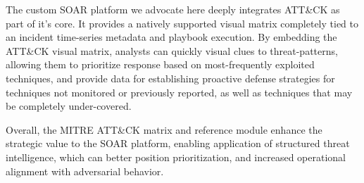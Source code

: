 The custom SOAR platform we advocate here deeply integrates ATT\&CK as part of it's core. It provides a natively supported visual matrix completely tied to an incident time-series metadata and playbook execution. By embedding the ATT\&CK visual matrix, analysts can quickly visual clues to threat-patterns, allowing them to prioritize response based on most-frequently exploited techniques, and provide data for establishing proactive defense strategies for techniques not monitored or previously reported, as well as techniques that may be completely under-covered.

Overall, the MITRE ATT\&CK matrix and reference module enhance the strategic value to the SOAR platform, enabling application of structured threat intelligence, which can better position prioritization, and increased operational alignment with adversarial behavior.